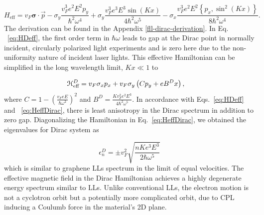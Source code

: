 \begin{equation} \label{eq:HDeff}
  H_{\text{eff}}= v_{F}\bm{\sigma}\cdot\vec{p}-\sigma_y\frac{v_F^3 e^2 E^2 p_y}{\hbar^{2}\omega^{4}}
  +\sigma_y\frac{v_F^3 e^3 E^{3}\sin{(Kx)}}{4\hbar^{2}\omega^{5}}
  -\sigma_x\frac{v_F^3 e^2 E^2 \left\{p_x, \sin^2{(Kx)} \right\} }{8\hbar^{2}\omega^{4}}.
\end{equation}
The derivation can be found in the Appendix \ref{fll-dirac-derivation}.
In Eq. ~\eqref{eq:HDeff}, the first order term in $\hbar \omega$ leads to gap at the Dirac point in normally incident, circularly polarized light experiments \cite{YHW, JWM} and is zero here due to the non-uniformity nature of incident laser lights.
This effective Hamiltonian can be simplified in the long wavelength limit, $Kx \ll 1$ to

\begin{align} \label{eq:HeffDirac}
  \mathcal{H}_{\text{eff}}^D &= v_{F}\sigma_{x}p_{x}+v_F\sigma_{y} \left( C p_{y} + eB^Dx \right),
\end{align}%
where $C = 1-\left(\tfrac{v_{F}eE}{\hbar\omega^2}\right)^2$ and $B^D=\frac{Kv_F^2 e^2E^3}{4\hbar^{2}\omega^{5}}$.
In accordance with Eqs.~\eqref{eq:HDeff} and ~\eqref{eq:HeffDirac}, there is least anisotropy in the Dirac spectrum in addition to zero gap.
Diagonalizing the Hamiltonian in Eq.~\eqref{eq:HeffDirac}, we obtained the eigenvalues for Dirac system as%

\begin{equation} \label{eq:DiracEner}
  \epsilon_{n}^D = \pm v_F^2 \sqrt{\dfrac{nK e^3 E^3}{2 \hbar \omega^5}}
\end{equation}
which is similar to graphene LLs spectrum in the limit of equal velocities.
The effective magnetic field in the Dirac Hamiltonian achieves a highly degenerate energy spectrum similar to LLs.
Unlike conventional LLs, the electron motion is not a cyclotron orbit but a potentially more complicated orbit, due to CPL inducing a Coulumb force in the material's 2D plane.

